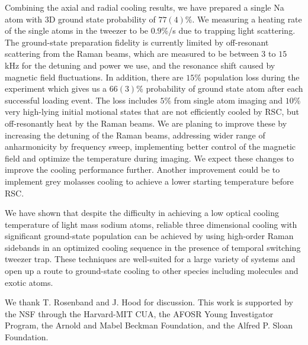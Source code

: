 \documentclass[aps,prl,twocolumn,groupedaddress]{revtex4-1}
\begin{document}
Combining the axial and radial cooling results,
we have prepared a single Na atom with 3D ground state probability of $77(4)$\%.
We measuring a heating rate of the single atoms in the tweezer to be $0.9$\%/s
due to trapping light scattering\cite{Grimm2000}.
The ground-state preparation fidelity is currently limited by off-resonant scattering
from the Raman beams,
which are measured to be between $3$ to $15$ kHz for the detuning and power we use,
and the resonance shift caused by magnetic field fluctuations.
In addition, there are $15$\% population loss during the experiment which gives us a $66(3)$\%
probability of ground state atom after each successful loading event.
The loss includes $5$\% from single atom imaging and
$10$\% very high-lying initial motional states
that are not efficiently cooled by RSC, but off-resonantly heat by the Raman beams.
We are planing to improve these by increasing the detuning of the Raman beams,
addressing wider range of anharmonicity by frequency sweep,
implementing better control of the magnetic field and optimize the temperature during imaging.
We expect these changes to improve the cooling performance further.
Another improvement could be to implement grey molasses cooling to achieve
a lower starting temperature before RSC\cite{Colzi2016}.

We have shown that despite the difficulty in achieving a low optical cooling temperature
of light mass sodium atoms, reliable three dimensional cooling
with significant ground-state population can be achieved by using high-order Raman sidebands
in an optimized cooling sequence in the presence of temporal switching tweezer trap.
These techniques are well-suited for a large variety of systems
and open up a route to ground-state cooling to other species including molecules and exotic atoms.

We thank T. Rosenband and J. Hood for discussion.
This work is supported by the NSF through the Harvard-MIT CUA,
the AFOSR Young Investigator Program, the Arnold and Mabel Beckman Foundation,
and the Alfred P. Sloan Foundation.



\end{document}
